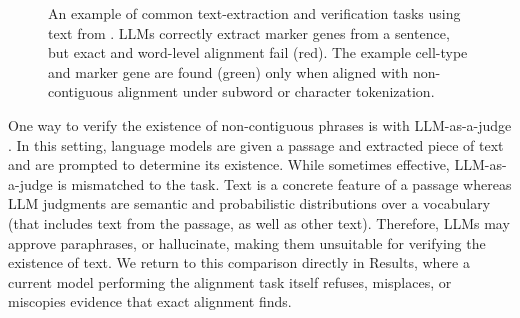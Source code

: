 \documentclass[10pt,twocolumn]{article}
\theoremstyle{plain}
\theoremstyle{definition}
\theoremstyle{remark}
\begin{document}
\begin{figure}[!t]
{{
  }
}

\caption{An example of common text-extraction and verification tasks using text from \citep{Hildreth2021}. LLMs correctly extract marker genes from a sentence, but exact and word-level alignment fail (red). The example cell-type and marker gene are found (green) only when aligned with non-contiguous alignment under subword or character tokenization.}
\label{fig:example}
\end{figure}

One way to verify the existence of non-contiguous phrases is with LLM-as-a-judge \citep{gu2025surveyllmasajudge}. In this setting, language models are given a passage and extracted piece of text and are prompted to determine its existence. While sometimes effective, LLM-as-a-judge is mismatched to the task. Text is a concrete feature of a passage whereas LLM judgments are semantic and probabilistic distributions over a vocabulary (that includes text from the passage, as well as other text). Therefore, LLMs may approve paraphrases, or hallucinate, making them unsuitable for verifying the existence of text. We return to this comparison directly in Results, where a current model performing the alignment task itself refuses, misplaces, or miscopies evidence that exact alignment finds.
\end{document}
